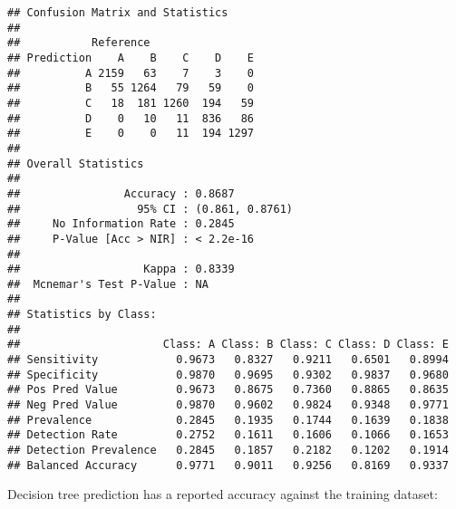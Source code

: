 \documentclass[]{article}
\newenvironment{Shaded}{\begin{snugshade}}{\end{snugshade}}
\newcommand{\KeywordTok}[1]{\textcolor[rgb]{0.13,0.29,0.53}{\textbf{{#1}}}}
\newcommand{\DataTypeTok}[1]{\textcolor[rgb]{0.13,0.29,0.53}{{#1}}}
\newcommand{\DecValTok}[1]{\textcolor[rgb]{0.00,0.00,0.81}{{#1}}}
\newcommand{\StringTok}[1]{\textcolor[rgb]{0.31,0.60,0.02}{{#1}}}
\newcommand{\NormalTok}[1]{{#1}}
\begin{document}
\begin{Shaded}
\end{Shaded}

\begin{verbatim}
## Confusion Matrix and Statistics
## 
##           Reference
## Prediction    A    B    C    D    E
##          A 2159   63    7    3    0
##          B   55 1264   79   59    0
##          C   18  181 1260  194   59
##          D    0   10   11  836   86
##          E    0    0   11  194 1297
## 
## Overall Statistics
##                                          
##                Accuracy : 0.8687         
##                  95% CI : (0.861, 0.8761)
##     No Information Rate : 0.2845         
##     P-Value [Acc > NIR] : < 2.2e-16      
##                                          
##                   Kappa : 0.8339         
##  Mcnemar's Test P-Value : NA             
## 
## Statistics by Class:
## 
##                      Class: A Class: B Class: C Class: D Class: E
## Sensitivity            0.9673   0.8327   0.9211   0.6501   0.8994
## Specificity            0.9870   0.9695   0.9302   0.9837   0.9680
## Pos Pred Value         0.9673   0.8675   0.7360   0.8865   0.8635
## Neg Pred Value         0.9870   0.9602   0.9824   0.9348   0.9771
## Prevalence             0.2845   0.1935   0.1744   0.1639   0.1838
## Detection Rate         0.2752   0.1611   0.1606   0.1066   0.1653
## Detection Prevalence   0.2845   0.1857   0.2182   0.1202   0.1914
## Balanced Accuracy      0.9771   0.9011   0.9256   0.8169   0.9337
\end{verbatim}

Decision tree prediction has a reported accuracy against the training
dataset:

\begin{Shaded}
\end{Shaded}
\end{document}
